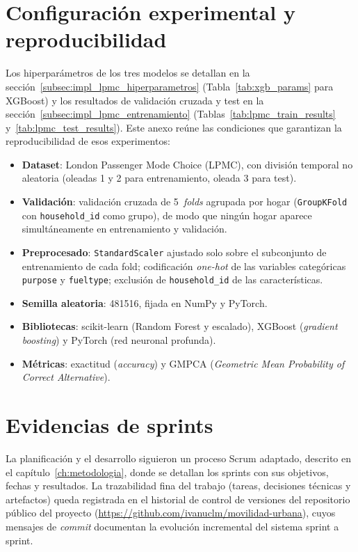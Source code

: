 \section{Configuración experimental y reproducibilidad}
\label{anx:experimentos}

Los hiperparámetros de los tres modelos se detallan en la sección~\ref{subsec:impl_lpmc_hiperparametros} (Tabla~\ref{tab:xgb_params} para XGBoost) y los resultados de validación cruzada y test en la sección~\ref{subsec:impl_lpmc_entrenamiento} (Tablas~\ref{tab:lpmc_train_results} y~\ref{tab:lpmc_test_results}). Este anexo reúne las condiciones que garantizan la reproducibilidad de esos experimentos:

\begin{itemize}
  \item \textbf{Dataset}: London Passenger Mode Choice (LPMC), con división temporal no aleatoria (oleadas 1 y 2 para entrenamiento, oleada 3 para test).
  \item \textbf{Validación}: validación cruzada de 5~\textit{folds} agrupada por hogar (\texttt{GroupKFold} con \texttt{household\_id} como grupo), de modo que ningún hogar aparece simultáneamente en entrenamiento y validación.
  \item \textbf{Preprocesado}: \texttt{StandardScaler} ajustado solo sobre el subconjunto de entrenamiento de cada fold; codificación \textit{one-hot} de las variables categóricas \texttt{purpose} y \texttt{fueltype}; exclusión de \texttt{household\_id} de las características.
  \item \textbf{Semilla aleatoria}: 481516, fijada en NumPy y PyTorch.
  \item \textbf{Bibliotecas}: scikit-learn (Random Forest y escalado), XGBoost (\textit{gradient boosting}) y PyTorch (red neuronal profunda).
  \item \textbf{Métricas}: exactitud (\textit{accuracy}) y GMPCA (\textit{Geometric Mean Probability of Correct Alternative}).
\end{itemize}

\section{Evidencias de sprints}
\label{anx:sprints}

La planificación y el desarrollo siguieron un proceso Scrum adaptado, descrito en el capítulo~\ref{ch:metodologia}, donde se detallan los sprints con sus objetivos, fechas y resultados. La trazabilidad fina del trabajo (tareas, decisiones técnicas y artefactos) queda registrada en el historial de control de versiones del repositorio público del proyecto (\url{https://github.com/ivanuclm/movilidad-urbana}), cuyos mensajes de \textit{commit} documentan la evolución incremental del sistema sprint a sprint.
